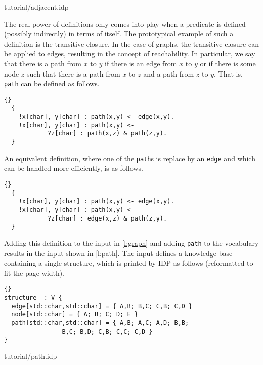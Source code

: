 \documentclass{article}
\newcommand{\idp}{{\sc IDP}\xspace}
\begin{document}

	{tutorial/adjacent.idp}

The real power of definitions only comes into play when
a predicate is defined (possibly indirectly) in terms of itself.
The prototypical example of such a definition is the transitive closure.
In the case of graphs, the transitive closure can be applied to edges,
resulting in the concept of reachability.
In particular, we say that there is a path from $x$ to $y$ if there
is an edge from $x$ to $y$ or if there is some node $z$ such that there
is a path from $x$ to $z$ and a path from $z$ to $y$.
That is, \texttt{path} can be defined as follows.
\begin{lstlisting}{}
  {
    !x[char], y[char] : path(x,y) <- edge(x,y).
    !x[char], y[char] : path(x,y) <-
		    ?z[char] : path(x,z) & path(z,y).
  }
\end{lstlisting}
An equivalent definition, where one of the \texttt{path}s
is replace by an \texttt{edge} and which can be handled more efficiently,
is as follows.
\begin{lstlisting}{}
  {
    !x[char], y[char] : path(x,y) <- edge(x,y).
    !x[char], y[char] : path(x,y) <-
		    ?z[char] : edge(x,z) & path(z,y).
  }
\end{lstlisting}
Adding this definition to the input in \autoref{l:graph} and
adding \texttt{path}
to the vocabulary results in the input shown in \autoref{l:path}.
The input defines a knowledge base containing a single structure,
which is printed by \idp
as follows (reformatted to fit the page width).
\begin{lstlisting}{}
structure  : V {
  edge[std::char,std::char] = { A,B; B,C; C,B; C,D }
  node[std::char] = { A; B; C; D; E }
  path[std::char,std::char] = { A,B; A,C; A,D; B,B;
			    B,C; B,D; C,B; C,C; C,D }
}

\end{lstlisting}


	{tutorial/path.idp}
\end{document}
